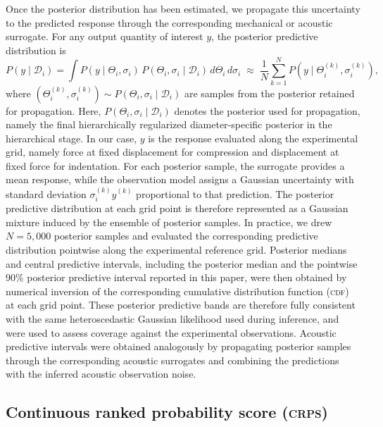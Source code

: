 \documentclass[%
 aip,
 jcp,
 amsmath,amssymb,
 preprint,%
]{revtex4-1}
\begin{document}
\noindent Once the posterior distribution has been estimated, we propagate this uncertainty to the predicted response through the corresponding mechanical or acoustic surrogate. For any output quantity of interest $y$, the posterior predictive distribution is
\begin{equation}
P\!\left(y \mid \mathcal{D}_i\right)
=
\int
P\!\left(y \mid \Theta_i, \sigma_i\right)\,
P\!\left(\Theta_i, \sigma_i \mid \mathcal{D}_i\right)\,
d\Theta_i\, d\sigma_i
\;\approx\;
\frac{1}{N}\sum_{k=1}^{N}
P\!\left(y \mid \Theta_i^{(k)}, \sigma_i^{(k)}\right),
\end{equation}
where $(\Theta_i^{(k)},\sigma_i^{(k)}) \sim P(\Theta_i,\sigma_i \mid \mathcal{D}_i)$ are samples from the posterior retained for propagation. Here, $P(\Theta_i,\sigma_i \mid \mathcal{D}_i)$ denotes the posterior used for propagation, namely the final hierarchically regularized diameter-specific posterior in the hierarchical stage. In our case, $y$ is the response evaluated along the experimental grid, namely force at fixed displacement for compression and displacement at fixed force for indentation. For each posterior sample, the surrogate provides a mean response, while the observation model assigns a Gaussian uncertainty with standard deviation $\sigma_i^{(k)} \hat{y}^{(k)}$ proportional to that prediction. The posterior predictive distribution at each grid point is therefore represented as a Gaussian mixture induced by the ensemble of posterior samples. In practice, we drew $N=5{,}000$ posterior samples and evaluated the corresponding predictive distribution pointwise along the experimental reference grid. Posterior medians and central predictive intervals, including the posterior median and the pointwise 90\% posterior predictive
interval reported in this paper, were then obtained by numerical inversion of the corresponding cumulative distribution function (\textsc{cdf}) at each grid point. These posterior predictive bands are therefore fully consistent with the same heteroscedastic Gaussian likelihood used during inference, and were used to assess coverage against the experimental observations. Acoustic predictive intervals were obtained analogously by propagating posterior samples through the corresponding acoustic surrogates and combining the predictions with the inferred acoustic observation noise.

\subsection{Continuous ranked probability score (\textsc{crps})}
\label{sec:meth:crps}
\end{document}
